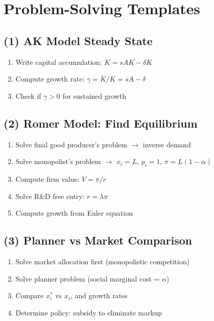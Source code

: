\documentclass[a4paper,11pt]{article}
\begin{document}
\clearpage

\section{Problem-Solving Templates}

\subsection*{(1) AK Model Steady State}
\begin{enumerate}
    \item Write capital accumulation: $\dot{K} = sAK - \delta K$
    \item Compute growth rate: $\gamma = \dot{K}/K = sA - \delta$
    \item Check if $\gamma > 0$ for sustained growth
\end{enumerate}

\subsection*{(2) Romer Model: Find Equilibrium}
\begin{enumerate}
    \item Solve final good producer's problem $\rightarrow$ inverse demand
    \item Solve monopolist's problem $\rightarrow$ $x_i = L$, $p_i = 1$, $\pi = L(1-\alpha)$
    \item Compute firm value: $V = \pi/r$
    \item Solve R\&D free entry: $r = \lambda\pi$
    \item Compute growth from Euler equation
\end{enumerate}

\subsection*{(3) Planner vs Market Comparison}
\begin{enumerate}
    \item Solve market allocation first (monopolistic competition)
    \item Solve planner problem (social marginal cost = $\alpha$)
    \item Compare $x_i^*$ vs $x_i$, and growth rates
    \item Determine policy: subsidy to eliminate markup
\end{enumerate}
\end{document}
